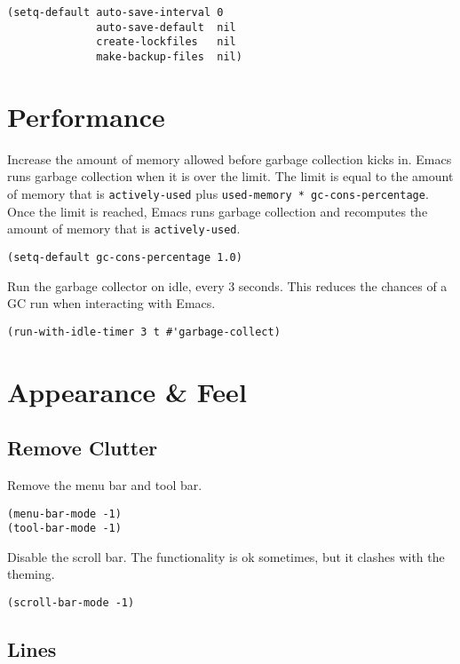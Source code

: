 \documentclass[11pt]{article}
\begin{document}
\begin{verbatim}
(setq-default auto-save-interval 0
              auto-save-default  nil
              create-lockfiles   nil
              make-backup-files  nil)
\end{verbatim}
\section{Performance}
\label{sec:orgedd83ef}

Increase the amount of memory allowed before garbage collection kicks in. Emacs
runs garbage collection when it is over the limit. The limit is equal to the
amount of memory that is \texttt{actively-used} plus \texttt{used-memory *
gc-cons-percentage}. Once the limit is reached, Emacs runs garbage collection
and recomputes the amount of memory that is \texttt{actively-used}.

\begin{verbatim}
(setq-default gc-cons-percentage 1.0)
\end{verbatim}

Run the garbage collector on idle, every 3 seconds. This reduces the chances of
a GC run when interacting with Emacs.

\begin{verbatim}
(run-with-idle-timer 3 t #'garbage-collect)
\end{verbatim}
\section{Appearance \& Feel}
\label{sec:org0e86dc9}

\subsection{Remove Clutter}
\label{sec:org1435df5}

Remove the menu bar and tool bar.

\begin{verbatim}
(menu-bar-mode -1)
(tool-bar-mode -1)
\end{verbatim}

Disable the scroll bar. The functionality is ok sometimes, but it clashes with
the theming.

\begin{verbatim}
(scroll-bar-mode -1)
\end{verbatim}
\subsection{Lines}
\label{sec:orge12f321}
\end{document}
